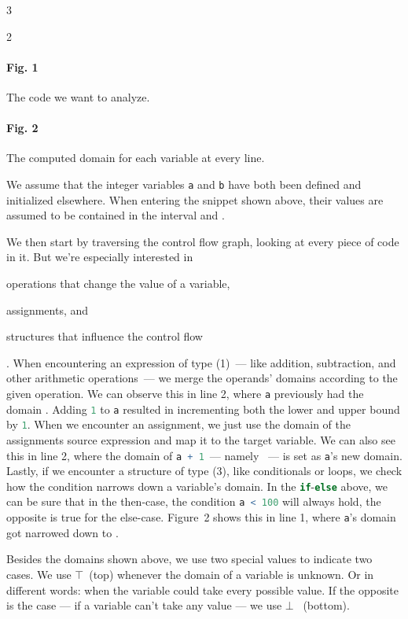 \documentclass[color,coloraccent=red!60!black,listings]{poster}
\def\rc#1{\lstinline[language=r]{#1}}
\def\tbot{{\mathversion{kp}$\bot$}}
\def\ttop{{\mathversion{kp}$\top$}}
\begin{document}
\begin{multicols}{3}
\begin{minipage}{\dimexpr2\columnwidth+\columnsep\relax}
\begin{multicols}{2}
			\paragraph{Fig. 1} The code we want to analyze.\par\columnbreak
			\par
			\paragraph{Fig. 2} The computed domain for each variable at every line.
		\end{multicols}\bigskip
		We assume that the integer variables \rc{a} and \rc{b} have both been defined
		and initialized elsewhere. When entering the snippet shown above, their values
		are assumed to be contained in the interval  and
		.\par
		We then start by traversing the control flow graph, looking at every piece of
		code in it. But we're especially interested in
		\begin{enumerate*}
			\item operations that change the value of a variable,
			\item assignments, and
			\item structures that influence the control flow
		\end{enumerate*}. When encountering an expression of type (1)~--- like addition,
		subtraction, and other arithmetic operations~--- we merge the operands' domains
		according to the given operation. We can observe this in line 2, where \rc{a}
		previously had the domain . Adding \rc1 to \rc{a} resulted in
		incrementing both the lower and upper bound by \rc1. When we encounter an
		assignment, we just use the domain of the assignments source expression and map
		it to the target variable. We can also see this in line 2, where the domain of
		\rc{a + 1}~--- namely ~--- is set as \rc{a}'s new domain.
		Lastly, if we encounter a structure of type (3), like conditionals or loops, we
		check how the condition narrows down a variable's domain. In the
		\rc{if}-\rc{else} above, we can be sure that in the then-case, the condition
		\rc{a < 100} will always hold, the opposite is true for the else-case. Figure~2
		shows this in line 1, where \rc{a}'s domain  got narrowed down
		to .\par
		Besides the domains shown above, we use two special values to indicate two
		cases. We use \ttop~(top) whenever the domain of a variable is unknown. Or in
		different words: when the variable could take every possible value. If the
		opposite is the case --- if a variable can't take any value --- we use \tbot~%
		(bottom).
		\endgroup
	\end{minipage}\vfill\columnbreak\null\columnbreak

\end{multicols}
\end{document}
